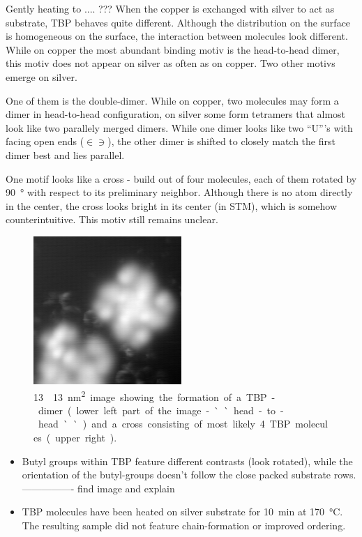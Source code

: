 Gently heating to  .... ???
When the copper is exchanged with silver to act as substrate, TBP behaves quite different. Although the distribution on the surface is homogeneous on the surface, the interaction between molecules look different. While on copper the most abundant binding motiv is the head-to-head dimer, this motiv does not appear on silver as often as on copper. Two other motivs emerge on silver.

One of them is the double-dimer.  While on copper, two molecules may form a dimer in head-to-head configuration, on silver some form tetramers that almost look like two parallely merged dimers. While one dimer looks like two ``U'''s with facing open ends ($\in \ni$), the other dimer is shifted to closely match the first dimer best and lies parallel.


One motif looks like a cross - build out of four molecules, each of them rotated by \SI{90}{\degree} with respect to its preliminary neighbor. Although there is no atom directly in the center, the cross looks bright in its center (in STM), which is somehow counterintuitive. This motiv still remains unclear.

\begin{figure}[h]
 \begin{center}
  \includegraphics[width=0.5\textwidth]{./images/F150612-154558.jpg}
 \end{center}
\caption{\SI{13}\times\SI{13}{\nm \squared} image showing the formation of a TBP-dimer (lower left part of the image - ``head-to-head``) and a cross consisting of most likely 4 TBP molecules (upper right).}
\end{figure}

\begin{itemize}
 \item Butyl groups within TBP feature different contrasts (look rotated), while the orientation of the butyl-groups doesn't follow the close packed substrate rows. ---------------- find image and explain
 \item TBP molecules have been heated on silver substrate for \SI{10}{\minute} at \SI{170}{\celsius}. The resulting sample did not feature chain-formation or improved ordering.
\end{itemize}

